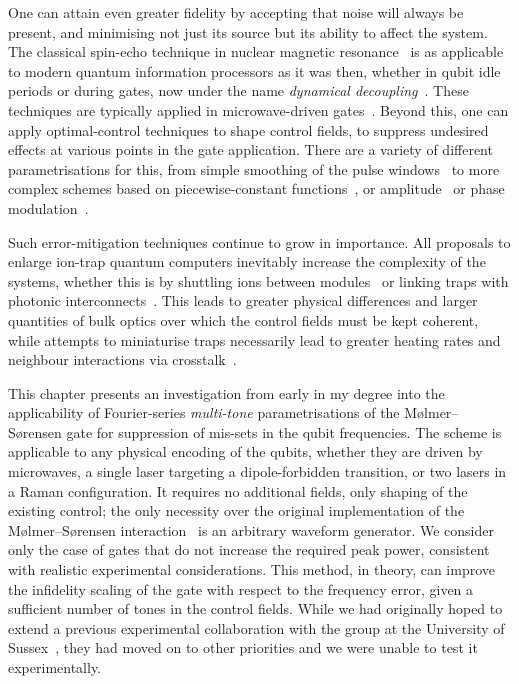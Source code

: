 One can attain even greater fidelity by accepting that noise will always be present, and minimising not just its source but its ability to affect the system.
The classical spin-echo technique in nuclear magnetic resonance~\cite{Hahn1950} is as applicable to modern quantum information processors as it was then, whether in qubit idle periods or during gates, now under the name \emph{dynamical decoupling}~\cite{Viola1998}.
These techniques are typically applied in microwave-driven gates~\cite{Bermudez2012,Harty2016,Sutherland2019}.
Beyond this, one can apply optimal-control techniques to shape control fields, to suppress undesired effects at various points in the gate application.
There are a variety of different parametrisations for this, from simple smoothing of the pulse windows~\cite{Benhelm2008} to more complex schemes based on piecewise-constant functions~\cite{Schaefer2018}, or amplitude~\cite{Haddadfarshi2016,Webb2018,Shapira2018} or phase modulation~\cite{Zarantonello2019,Milne2020}.

Such error-mitigation techniques continue to grow in importance.
All proposals to enlarge ion-trap quantum computers inevitably increase the complexity of the systems, whether this is by shuttling ions between modules~\cite{Lekitsch2017} or linking traps with photonic interconnects~\cite{Monroe2014,Stephenson2020}.
This leads to greater physical differences and larger quantities of bulk optics over which the control fields must be kept coherent, while attempts to miniaturise traps necessarily lead to greater heating rates and neighbour interactions via crosstalk~\cite{Bruzewicz2019}.

This chapter presents an investigation from early in my degree into the applicability of Fourier-series \emph{multi-tone} parametrisations of the M\o lmer--S\o rensen gate for suppression of mis-sets in the qubit frequencies.
The scheme is applicable to any physical encoding of the qubits, whether they are driven by microwaves, a single laser targeting a dipole-forbidden transition, or two lasers in a Raman configuration.
It requires no additional fields, only shaping of the existing control; the only necessity over the original implementation of the M\o lmer--S\o rensen interaction~\cite{Sackett2000} is an arbitrary waveform generator.
We consider only the case of gates that do not increase the required peak power, consistent with realistic experimental considerations.
This method, in theory, can improve the infidelity scaling of the gate with respect to the frequency error, given a sufficient number of tones in the control fields.
While we had originally hoped to extend a previous experimental collaboration with the group at the University of Sussex~\cite{Webb2018}, they had moved on to other priorities and we were unable to test it experimentally.



